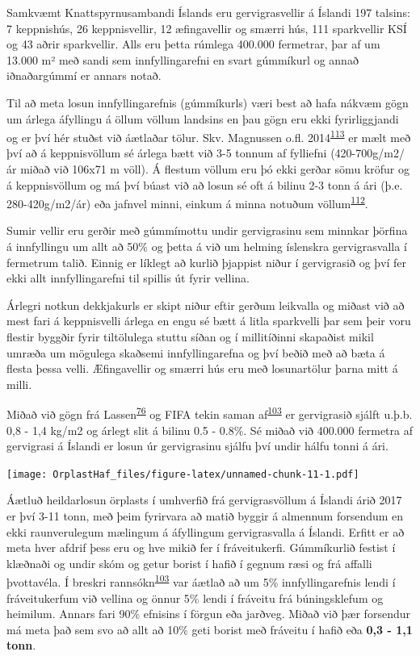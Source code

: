\documentclass[icelandic,]{book}
\begin{document}
Samkvæmt Knattspyrnusambandi Íslands eru gervigrasvellir á Íslandi 197 talsins: 7 keppnishús, 26 keppnisvellir, 12 æfingavellir og smærri hús, 111 sparkvellir KSÍ og 43 aðrir sparkvellir. Alls eru þetta rúmlega 400.000 fermetrar, þar af um 13.000 m² með sandi sem innfyllingarefni en svart gúmmíkurl og annað iðnaðargúmmí er annars notað.

Til að meta losun innfyllingarefnis (gúmmíkurls) væri best að hafa nákvæm gögn um árlega áfyllingu á öllum völlum landsins en þau gögn eru ekki fyrirliggjandi og er því hér stuðst við áætlaðar tölur. Skv. Magnussen o.fl. 2014\textsuperscript{\protect\hyperlink{ref-magnusson2014mikroskrap}{113}} er mælt með því að á keppnisvöllum sé árlega bætt við 3-5 tonnum af fylliefni (420-700g/m2/ár miðað við 106x71 m völl). Á flestum völlum eru þó ekki gerðar sömu kröfur og á keppnisvöllum og má því búast við að losun sé oft á bilinu 2-3 tonn á ári (þ.e. 280-420g/m2/ár) eða jafnvel minni, einkum á minna notuðum völlum\textsuperscript{\protect\hyperlink{ref-magnusson2016swedish}{112}}.

Sumir vellir eru gerðir með gúmmímottu undir gervigrasinu sem minnkar þörfina á innfyllingu um allt að 50\% og þetta á við um helming íslenskra gervigrasvalla í fermetrum talið. Einnig er líklegt að kurlið þjappist niður í gervigrasið og því fer ekki allt innfyllingarefni til spillis út fyrir vellina.

Árlegri notkun dekkjakurls er skipt niður eftir gerðum leikvalla og miðast við að mest fari á keppnisvelli árlega en engu sé bætt á litla sparkvelli þar sem þeir voru flestir byggðir fyrir tiltölulega stuttu síðan og í millitíðinni skapaðist mikil umræða um mögulega skaðsemi innfyllingarefna og því beðið með að bæta á flesta þessa velli. Æfingavellir og smærri hús eru með losunartölur þarna mitt á milli.

Miðað við gögn frá Lassen\textsuperscript{\protect\hyperlink{ref-lassen2015microplastics}{76}} og FIFA tekin saman af\textsuperscript{\protect\hyperlink{ref-Hann2018}{103}} er gervigrasið sjálft u.þ.b. 0,8 - 1,4 kg/m2 og árlegt slit á bilinu 0.5 - 0.8\%. Sé miðað við 400.000 fermetra af gervigrasi á Íslandi er losun úr gervigrasinu sjálfu því undir hálfu tonni á ári.

\texttt{[image: OrplastHaf\_files/figure-latex/unnamed-chunk-11-1.pdf]}

Áætluð heildarlosun örplasts í umhverfið frá gervigrasvöllum á Íslandi árið 2017 er því 3-11 tonn, með þeim fyrirvara að matið byggir á almennum forsendum en ekki raunverulegum mælingum á áfyllingum gervigrasvalla á Íslandi. Erfitt er að meta hver afdrif þess eru og hve mikið fer í fráveitukerfi. Gúmmíkurlið festist í klæðnaði og undir skóm og getur borist í hafið í gegnum ræsi og frá affalli þvottavéla. Í breskri rannsókn\textsuperscript{\protect\hyperlink{ref-Hann2018}{103}} var áætlað að um 5\% innfyllingarefnis lendi í fráveitukerfum við vellina og önnur 5\% lendi í fráveitu frá búningsklefum og heimilum. Annars fari 90\% efnisins í förgun eða jarðveg. Miðað við þær forsendur má meta það sem svo að allt að 10\% geti borist með fráveitu í hafið eða \textbf{0,3 - 1,1 tonn}.
\end{document}
